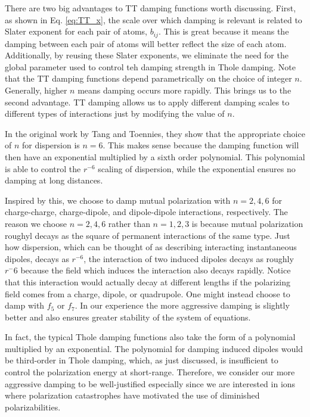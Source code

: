 \documentclass[journal=jacsat,manuscript=article]{achemso}
\begin{document}
There are two big advantages to TT damping functions worth discussing. First, as
shown in Eq. \ref{eq:TT_x}, the scale over which damping is relevant is related to
Slater exponent for each pair of atoms, $b_{ij}$. This is great because it means the
damping between each pair of atoms will better reflect the size of each atom. Additionally,
by reusing these Slater exponents, we eliminate the need for the global parameter used
to control teh damping strength in Thole damping. Note that the TT damping functions
depend parametrically on the choice of integer $n$. Generally, higher $n$ means
damping occurs more rapidly. This brings us to the second advantage. TT damping
allows us to apply different damping scales to different types of interactions
just by modifying the value of $n$.

In the original work by Tang and Toennies, they show that the appropriate choice
of $n$ for dispersion is $n=6$. This makes sense because the damping function will
then have an exponential multiplied by a sixth order polynomial. This polynomial is
able to control the $r^{-6}$ scaling of dispersion, while the exponential ensures no
damping at long distances.

Inspired by this, we choose to damp mutual polarization with $n=2,4,6$ for
charge-charge, charge-dipole, and dipole-dipole interactions, respectively.
The reason we choose $n=2,4,6$ rather than $n=1,2,3$ is because mutual polarization
roughyl decays as the square of permanent interactions of the same type.
Just how dispersion, which can be thought of as describing interacting instantaneous dipoles,
decays as $r^{-6}$, the interaction of two induced dipoles decays as roughly
$r^-6$ because the field which induces the interaction also decays rapidly.
Notice that this interaction would actually decay at different lengths if the polarizing
field comes from a charge, dipole, or quadrupole. One might instead choose to damp
with $f_5$ or $f_7$. In our experience the more aggressive damping is slightly better
and also ensures greater stability of the system of equations.

In fact, the typical Thole damping functions also take the form of a polynomial
multiplied by an exponential. The polynomial for damping induced dipoles would
be third-order in Thole damping, which, as just discussed, is insufficient to control the polarization
energy at short-range. Therefore, we consider our more aggressive damping to be well-justified
especially since we are interested in ions where polarization catastrophes have
motivated the use of diminished polarizabilities.\cite{ponder2010current}
\end{document}
